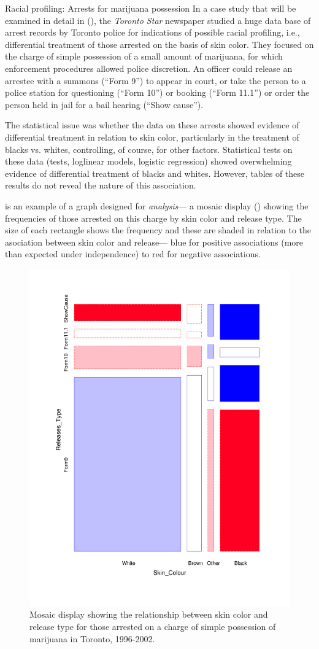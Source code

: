 \documentclass[11pt]{book}
\begin{document}
\begin{Example}[arrests0]{Racial profiling: Arrests for marijuana possession}
In a case study that will be examined in detail in  (),
the \emph{Toronto Star} newspaper studied a huge data base of arrest records by
Toronto police for indications of possible racial profiling, i.e., differential
treatment of those arrested on the basis of skin color.
They focused on the charge of simple possession of a small amount of marijuana,
for which enforcement procedures allowed police discretion.  An officer could
release an arrestee with a summons (``Form 9'') to appear in court,
or take the person to a police station for questioning (``Form 10'') or
booking (``Form 11.1'') or order the person held in jail for a bail hearing (``Show cause'').

The statistical issue was whether the data on these arrests showed evidence of differential
treatment in relation to skin color, particularly in the treatment of blacks vs. whites,
controlling, of course, for other factors. Statistical tests on these data
(\chisq tests, loglinear models, logistic regression) showed overwhelming evidence of
differential treatment of blacks and whites. However, tables of these results do not
reveal the nature of this association.

 is an example of
a graph designed for \emph{analysis}--- a mosaic display ()
showing the frequencies of those arrested
on this charge by skin color and release type.  The size of each rectangle shows the
frequency and these are shaded in relation to the asociation between skin color and
release--- blue for positive associations (more than expected under independence) to
red for negative associations.  
\begin{figure}[htb]
\centering
\includegraphics[width=.5\textwidth]{ch01/fig/arrests-skin-color}
\caption{Mosaic display showing the relationship between skin color and release type for those arrested on a charge of simple possession of marijuana in Toronto, 1996-2002.}\label{fig:arrests0-mosaic}
\end{figure}


\end{Example}
\end{document}
